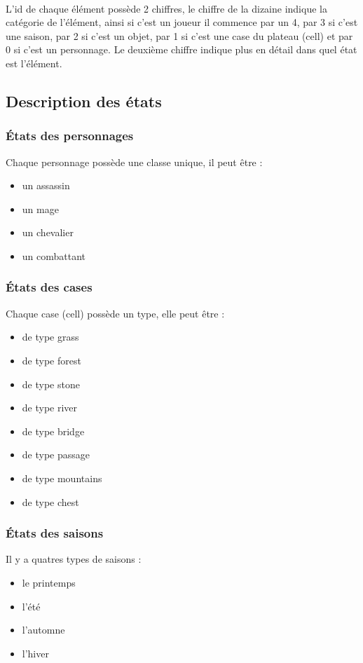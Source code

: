 \documentclass[a4paper,12pt]{article}
\begin{document}
\paragraph{} L'id de chaque élément possède 2 chiffres, le chiffre de la dizaine indique la catégorie de l'élément, ainsi si c'est un joueur il commence par un 4, par 3 si c'est une saison, par 2 si c'est un objet, par 1 si c'est une case du plateau (cell) et par 0 si c'est un personnage. Le deuxième chiffre indique plus en détail dans quel état est l'élément.     
\subsection{Description des états}
\subsubsection{États des personnages}
Chaque personnage possède une classe unique, il peut être :
\begin{itemize}
\item un assassin
\item un mage
\item un chevalier
\item un combattant
\end{itemize}
\subsubsection{États des cases}
Chaque case (cell) possède un type, elle peut être :
\begin{itemize}
\item de type grass
\item de type forest
\item de type stone
\item de type river
\item de type bridge
\item de type passage
\item de type mountains
\item de type chest
\end{itemize}
\subsubsection{États des saisons}
Il y a quatres types de saisons :
\begin{itemize}
\item le printemps
\item l'été
\item l'automne
\item l'hiver
\end{itemize}
\end{document}
